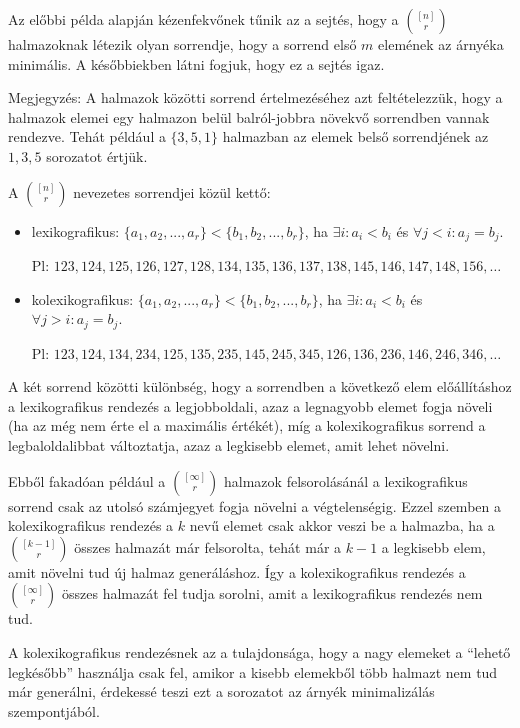 \begin{obs}
  Az előbbi példa alapján kézenfekvőnek tűnik az a sejtés, hogy a $\binom{[n]}{r}$ halmazoknak létezik olyan sorrendje, hogy a sorrend első $m$ elemének az árnyéka minimális. A későbbiekben látni fogjuk, hogy ez a sejtés igaz.
\end{obs}

Megjegyzés: A halmazok közötti sorrend értelmezéséhez azt feltételezzük, hogy a halmazok elemei egy halmazon belül balról-jobbra növekvő sorrendben vannak rendezve. Tehát például a $\{3, 5, 1\}$ halmazban az elemek belső sorrendjének az $1, 3, 5$ sorozatot értjük.

\vspace{1em}

\noindent A $\binom{[n]}{r}$ nevezetes sorrendjei közül kettő:
\begin{itemize}
  \item lexikografikus:\hphantom{ko} $\{a_1, a_2, ..., a_r\} < \{b_1, b_2, ..., b_r\}$, ha $\exists i: a_i < b_i$ és $\forall j < i: a_j = b_j$.

  Pl: $123, 124, 125, 126, 127, 128, 134, 135, 136, 137, 138, 145, 146, 147, 148, 156, \dots$

  \item kolexikografikus: $\{a_1, a_2, ..., a_r\} < \{b_1, b_2, ..., b_r\}$, ha $\exists i: a_i < b_i$ és $\forall j > i: a_j = b_j$.

  Pl: $123, 124, 134, 234, 125, 135, 235, 145, 245, 345, 126, 136, 236, 146, 246, 346, \dots$
\end{itemize}

A két sorrend közötti különbség, hogy a sorrendben a következő elem előállításhoz a lexikografikus rendezés a legjobboldali, azaz a legnagyobb elemet fogja növeli (ha az még nem érte el a maximális értékét), míg a kolexikografikus sorrend a legbaloldalibbat változtatja, azaz a legkisebb elemet, amit lehet növelni.

Ebből fakadóan például a $\binom{[\infty]}{r}$ halmazok felsorolásánál a lexikografikus sorrend csak az utolsó számjegyet fogja növelni a végtelenségig. Ezzel szemben a kolexikografikus rendezés a $k$ nevű elemet csak akkor veszi be a halmazba, ha a $\binom{[k-1]}{r}$ összes halmazát már felsorolta, tehát már a $k-1$ a legkisebb elem, amit növelni tud új halmaz generáláshoz. Így a kolexikografikus rendezés a $\binom{[\infty]}{r}$ összes halmazát fel tudja sorolni, amit a lexikografikus rendezés nem tud.

A kolexikografikus rendezésnek az a tulajdonsága, hogy a nagy elemeket a ``lehető legkésőbb'' használja csak fel, amikor a kisebb elemekből több halmazt nem tud már generálni, érdekessé teszi ezt a sorozatot az árnyék minimalizálás szempontjából.
